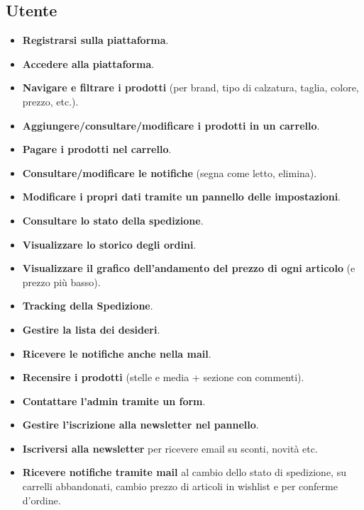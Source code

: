 \documentclass[a4paper,12pt]{report}
\begin{document}
	\subsection{Utente}
	\begin{itemize}
		\item \textbf{Registrarsi sulla piattaforma}.
		\item \textbf{Accedere alla piattaforma}.
		\item \textbf{Navigare e filtrare i prodotti} (per brand, tipo di calzatura, taglia, colore, prezzo, etc.).
		\item \textbf{Aggiungere/consultare/modificare i prodotti in un carrello}.
		\item \textbf{Pagare i prodotti nel carrello}.
		\item \textbf{Consultare/modificare le notifiche} (segna come letto, elimina).
		\item \textbf{Modificare i propri dati tramite un pannello delle impostazioni}.
		\item \textbf{Consultare lo stato della spedizione}.
		\item \textbf{Visualizzare lo storico degli ordini}.
		\item \textbf{Visualizzare il grafico dell’andamento del prezzo di ogni articolo} (e prezzo più basso).
		\item \textbf{Tracking della Spedizione}.
		\item \textbf{Gestire la lista dei desideri}.
		\item \textbf{Ricevere le notifiche anche nella mail}.
		\item \textbf{Recensire i prodotti} (stelle e media + sezione con commenti).
		\item \textbf{Contattare l’admin tramite un form}.
		\item \textbf{Gestire l’iscrizione alla newsletter nel pannello}.
		\item \textbf{Iscriversi alla newsletter} per ricevere email su sconti, novità etc.
		\item \textbf{Ricevere notifiche tramite mail} al cambio dello stato di spedizione, su carrelli abbandonati, cambio prezzo di articoli in wishlist e per conferme d’ordine.
	\end{itemize}
\end{document}
